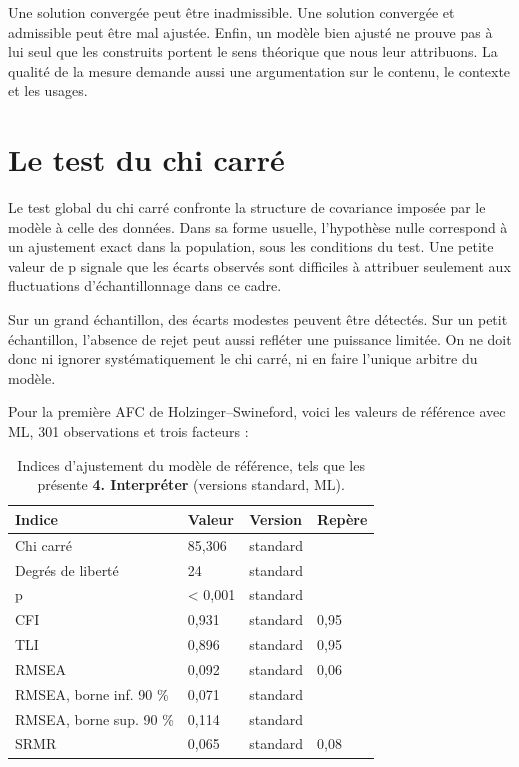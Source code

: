 \documentclass[
  french,
  11pt,
  a4paper,
  DIV=11,
  numbers=noendperiod]{scrreprt}
\begin{document}
Une solution convergée peut être inadmissible. Une solution convergée et
admissible peut être mal ajustée. Enfin, un modèle bien ajusté ne prouve
pas à lui seul que les construits portent le sens théorique que nous
leur attribuons. La qualité de la mesure demande aussi une argumentation
sur le contenu, le contexte et les usages.

\section{Le test du chi carré}\label{le-test-du-chi-carruxe9}

Le test global du chi carré confronte la structure de covariance imposée
par le modèle à celle des données. Dans sa forme usuelle, l'hypothèse
nulle correspond à un ajustement exact dans la population, sous les
conditions du test. Une petite valeur de p signale que les écarts
observés sont difficiles à attribuer seulement aux fluctuations
d'échantillonnage dans ce cadre.

Sur un grand échantillon, des écarts modestes peuvent être détectés. Sur
un petit échantillon, l'absence de rejet peut aussi refléter une
puissance limitée. On ne doit donc ni ignorer systématiquement le chi
carré, ni en faire l'unique arbitre du modèle.

Pour la première AFC de Holzinger--Swineford, voici les valeurs de
référence avec ML, 301 observations et trois facteurs :


{

\begin{longtable}[]{@{}llll@{}}

\caption{\label{tbl-hs-indices}Indices d'ajustement du modèle de
référence, tels que les présente \textbf{4. Interpréter} (versions
standard, ML).}

\tabularnewline

\toprule\noalign{}
Indice & Valeur & Version & Repère \\
\midrule\noalign{}
\endhead
\bottomrule\noalign{}
\endlastfoot
Chi carré & 85,306 & standard & \\
Degrés de liberté & 24 & standard & \\
p & \textless{} 0,001 & standard & \\
CFI & 0,931 & standard & 0,95 \\
TLI & 0,896 & standard & 0,95 \\
RMSEA & 0,092 & standard & 0,06 \\
RMSEA, borne inf. 90 \% & 0,071 & standard & \\
RMSEA, borne sup. 90 \% & 0,114 & standard & \\
SRMR & 0,065 & standard & 0,08 \\

\end{longtable}

}
\end{document}
